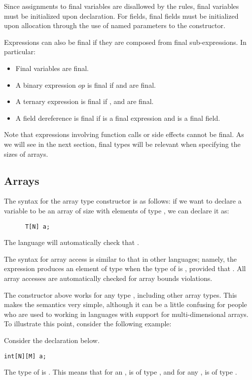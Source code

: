 Since assignments to final variables are disallowed by the rules, final variables must be initialized upon declaration. For fields, final fields must be initialized upon allocation through the use of named parameters to the constructor.

Expressions can also be final if they are composed from final sub-expressions. In particular:

\begin{itemize}
\item Final variables are final.
\item A binary expression   $op$   is final if  and  are final.
\item A ternary expression  is final if , and  are final.
\item A field dereference  is final if  is a final expression and  is a final field.
\end{itemize}

Note that expressions involving function calls or side effects cannot be final. As we will see in the next section, final types will be relevant when specifying the sizes of arrays.

\subsection{Arrays}
The syntax for the array type constructor is as follows: if we want to declare a variable  to be an array of size  with elements of type , we can declare it as:
\begin{lstlisting}
      T[N] a;
\end{lstlisting}
The language will automatically check that .

The syntax for array access is similar to that in other languages; namely, the expression  produces an element of type  when the type of  is , provided that . All array accesses are automatically checked for array bounds violations.

The constructor above works for any type , including other array types. This makes the semantics very simple, although it can be a little confusing for people who are used to working in languages with support for multi-dimensional arrays. To illustrate this point, consider the following example:
\begin{Example}
Consider the declaration below.
\begin{lstlisting}
int[N][M] a;
\end{lstlisting}
The type of  is . This means that for an ,  is of type , and for any ,  is of type .
\end{Example}

